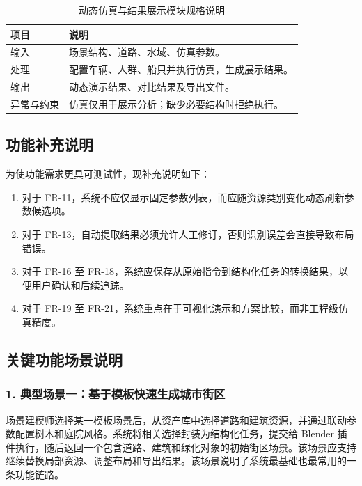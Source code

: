\documentclass[UTF8,a4paper,10pt]{ctexart}
\begin{document}
{
\renewcommand{\arraystretch}{1.3}

\begin{table}[H]
\centering
\caption{动态仿真与结果展示模块规格说明}

\begin{tabularx}{\textwidth}{p{2.6cm} Y}
\toprule
{}
\textbf{项目} & \textbf{说明} \\
\midrule

输入 & 场景结构、道路、水域、仿真参数。 \\
处理 & 配置车辆、人群、船只并执行仿真，生成展示结果。 \\
输出 & 动态演示结果、对比结果及导出文件。 \\
异常与约束 & 仿真仅用于展示分析；缺少必要结构时拒绝执行。 \\

\bottomrule
\end{tabularx}
\end{table}
}


\subsection{功能补充说明}
为使功能需求更具可测试性，现补充说明如下：
\begin{enumerate}[label=\arabic*.]
    \item 对于 FR-11，系统不应仅显示固定参数列表，而应随资源类别变化动态刷新参数候选项。
    \item 对于 FR-13，自动提取结果必须允许人工修订，否则识别误差会直接导致布局错误。
    \item 对于 FR-16 至 FR-18，系统应保存从原始指令到结构化任务的转换结果，以便用户确认和后续追踪。
    \item 对于 FR-19 至 FR-21，系统重点在于可视化演示和方案比较，而非工程级仿真精度。
\end{enumerate}

\subsection{关键功能场景说明}
\subsubsection*{1. 典型场景一：基于模板快速生成城市街区}
场景建模师选择某一模板场景后，从资产库中选择道路和建筑资源，并通过联动参数配置树木和庭院风格。系统将相关选择封装为结构化任务，提交给 Blender 插件执行，随后返回一个包含道路、建筑和绿化对象的初始街区场景。该场景应支持继续替换局部资源、调整布局和导出结果。该场景说明了系统最基础也最常用的一条功能链路。
\end{document}
